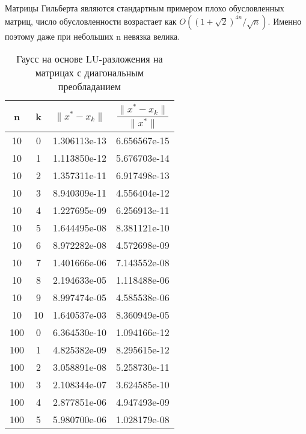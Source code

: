 \documentclass[a4paper,12pt]{article}
\begin{document}
Матрицы Гильберта являются стандартным примером плохо обусловленных матриц, число обусловленности возрастает как $O((1+{\sqrt  {2}})^{{4n}}/{\sqrt{n}})$. Именно поэтому даже при небольших n невязка велика.



\clearpage

\begin{table}[]
\centering
\caption{Гаусс на основе LU-разложения на матрицах с диагональным преобладанием}
\begin{tabular}{|c|c|c|c|}
\hline
\rowcolor[HTML]{FFE5B4} 
n    & k  &   $\|x^* - x_k\|$           &       $\dfrac{\|x^* - x_k\|}{\|x^*\|}$       \\ \hline
\rowcolor[HTML]{FDEED9} 
10   & 0  & 1.306113e-13 & 6.656567e-15 \\ \hline
\rowcolor[HTML]{FDEED9} 
10   & 1  & 1.113850e-12 & 5.676703e-14 \\ \hline
\rowcolor[HTML]{FDEED9} 
10   & 2  & 1.357311e-11 & 6.917498e-13 \\ \hline
\rowcolor[HTML]{FDEED9} 
10   & 3  & 8.940309e-11 & 4.556404e-12 \\ \hline
\rowcolor[HTML]{FDEED9} 
10   & 4  & 1.227695e-09 & 6.256913e-11 \\ \hline
\rowcolor[HTML]{FDEED9} 
10   & 5  & 1.644495e-08 & 8.381121e-10 \\ \hline
\rowcolor[HTML]{FDEED9} 
10   & 6  & 8.972282e-08 & 4.572698e-09 \\ \hline
\rowcolor[HTML]{FDEED9} 
10   & 7  & 1.401666e-06 & 7.143552e-08 \\ \hline
\rowcolor[HTML]{FDEED9} 
10   & 8  & 2.194633e-05 & 1.118488e-06 \\ \hline
\rowcolor[HTML]{FDEED9} 
10   & 9  & 8.997474e-05 & 4.585538e-06 \\ \hline
\rowcolor[HTML]{FDEED9} 
10   & 10 & 1.640537e-03 & 8.360949e-05 \\ \hline
\rowcolor[HTML]{FDEED9} 
100  & 0  & 6.364530e-10 & 1.094166e-12 \\ \hline
\rowcolor[HTML]{FDEED9} 
100  & 1  & 4.825382e-09 & 8.295615e-12 \\ \hline
\rowcolor[HTML]{FDEED9} 
100  & 2  & 3.058891e-08 & 5.258730e-11 \\ \hline
\rowcolor[HTML]{FDEED9} 
100  & 3  & 2.108344e-07 & 3.624585e-10 \\ \hline
\rowcolor[HTML]{FDEED9} 
100  & 4  & 2.877851e-06 & 4.947493e-09 \\ \hline
\rowcolor[HTML]{FDEED9} 
100  & 5  & 5.980700e-06 & 1.028179e-08 \\ \hline

\end{tabular}
\end{table}
\end{document}
